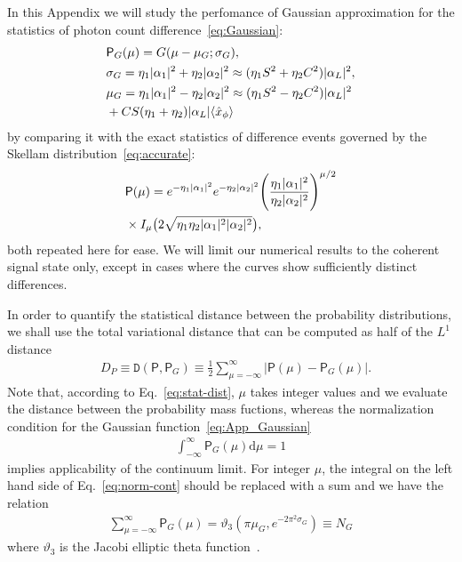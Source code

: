 \documentclass[%
reprint,
superscriptaddress,
 amsmath,amssymb,amsfonts,
 aps,
 pra,
 longbibliography
]{revtex4-2}
\newcommand{\avr}[1]{\ensuremath{\langle{#1}\rangle}}
\newcommand{\prob}{\mathsf{P}}
\newcommand{\dd}{\mathrm{d}}
\begin{document}
In this Appendix we will study the perfomance of Gaussian approximation for the statistics of photon count difference~\eqref{eq:Gaussian}:
\begin{align}
  &
  \label{eq:App_Gaussian}
    \prob_G(\mu)=G(\mu-\mu_G;\sigma_G),
    \\
  &
    \label{eq:App_sigma_G}
    \sigma_G=\eta_1|\alpha_1|^2+\eta_2|\alpha_2|^2
    \approx
    (\eta_1S^2+\eta_2C^2) |\alpha_L|^2,
  \\
  &
    \label{eq:App_mu_G}
    \mu_G=\eta_1|\alpha_1|^2-\eta_2|\alpha_2|^2
    \approx
    (\eta_1S^2-\eta_2C^2) |\alpha_L|^2
    \notag
  \\
  &
    +CS (\eta_1+\eta_2) |\alpha_L| \avr{\hat{x}_\phi}
\end{align}
by comparing it with the exact statistics of difference events
governed by the Skellam distribution~\eqref{eq:accurate}:
\begin{align}
  &
  \label{eq:App_accurate}
  \prob(\mu)=e^{-\eta_1|\alpha_1|^2}e^{-\eta_2|\alpha_2|^2}
    \Biggl(\frac{\eta_1|\alpha_1|^2}{\eta_2|\alpha_2|^2}\Biggr)^{\mu/2}
    \notag
  \\
  &
    \times
I_{\mu}\bigl(2\sqrt{\eta_1\eta_2|\alpha_1|^2|\alpha_2|^2}\bigr),
\end{align}
both repeated here for ease. We will limit our numerical results to the coherent signal state only, except in cases where the curves show sufficiently distinct differences.

In order to quantify the statistical distance between the probability distributions,
we shall use
the total variational distance
that can be computed as half of the $L^1$ distance
\begin{align}
  &
    \label{eq:stat-dist}
    D_P\equiv\mathtt{D}\left(\prob,\prob_{G}\right)\equiv
    \frac{1}{2}
    \sum_{\mu=-\infty}^{\infty}
    \lvert\prob(\mu) -\prob_G(\mu)\rvert.
  \end{align}
  Note that, according to Eq.~\eqref{eq:stat-dist},
  $\mu$ takes integer values and
  we evaluate the distance between the probability mass fuctions,
  whereas the normalization condition for
the Gaussian function~\eqref{eq:App_Gaussian}
\begin{align}
    \label{eq:norm-cont}
  \int_{-\infty}^{\infty}
    \prob_G(\mu)
  \dd\mu
    =1
\end{align}
implies applicability of the continuum limit.
For integer $\mu$,
the integral
on the left hand side of Eq.~\eqref{eq:norm-cont}
should be replaced with a sum
and we have the relation
\begin{align}
  \label{eq:discr-norm}
  \sum_{\mu=-\infty}^{\infty} \prob_G(\mu)=\vartheta_3(\pi\mu_G,e^{-2\pi^2\sigma_G})\equiv N_G
\end{align}
where $\vartheta_3$ is the Jacobi elliptic theta function~\cite{NIST:hndbk:2010}.
\end{document}
